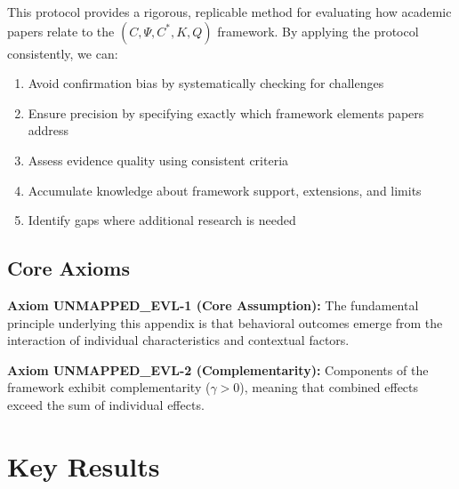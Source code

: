 This protocol provides a rigorous, replicable method for evaluating how academic papers
relate to the $(C, \Psi, C^*, K, Q)$ framework. By applying the protocol consistently, we can:
\begin{enumerate}
  \item Avoid confirmation bias by systematically checking for challenges
  \item Ensure precision by specifying exactly which framework elements papers address
  \item Assess evidence quality using consistent criteria
  \item Accumulate knowledge about framework support, extensions, and limits
  \item Identify gaps where additional research is needed
\end{enumerate}


\subsection{Core Axioms}
\label{sec:evl-axioms}

\begin{tcolorbox}[colback=yellow!5!white,colframe=yellow!75!black,title=Axiom UNMAPPED_EVL-1: Fundamental Principle]
\textbf{Axiom UNMAPPED_EVL-1 (Core Assumption):}
The fundamental principle underlying this appendix is that behavioral outcomes
emerge from the interaction of individual characteristics and contextual factors.
\end{tcolorbox}

\begin{tcolorbox}[colback=yellow!5!white,colframe=yellow!75!black,title=Axiom UNMAPPED_EVL-2: Complementarity]
\textbf{Axiom UNMAPPED_EVL-2 (Complementarity):}
Components of the framework exhibit complementarity ($\gamma > 0$), meaning
that combined effects exceed the sum of individual effects.
\end{tcolorbox}



\section{Key Results}
\label{sec:evl-results}

